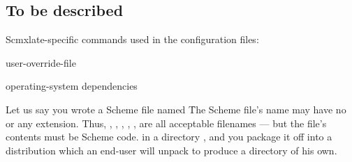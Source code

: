 \subsection{To be described}

Scmxlate-specific commands used in the
configuration files:

user-override-file

operating-system dependencies

Let us say you wrote a Scheme file named
\f{The Scheme file's name may have no or
any extension.  Thus, ,
, ,
, ,
 are all acceptable filenames
--- but the file's contents must be Scheme code.} in a
directory , and you package it off into a
distribution which an end-user will unpack to
produce a directory  of his own.
